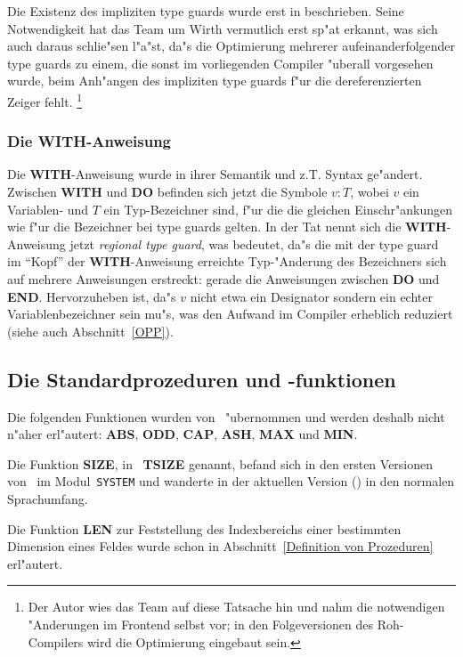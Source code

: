 Die Existenz des impliziten type guards wurde erst in \cite{op2doc} beschrieben.
Seine Notwendigkeit hat das Team um Wirth vermutlich erst sp"at erkannt, was
sich auch daraus schlie"sen l"a"st, da"s die Optimierung mehrerer aufeinanderfolgender
type guards zu einem, die sonst im vorliegenden Compiler "uberall vorgesehen
wurde, beim Anh"angen des impliziten type guards f"ur die dereferenzierten Zeiger
fehlt.%
\footnote{Der Autor wies das Team auf diese Tatsache hin und nahm die notwendigen
  "Anderungen im Frontend selbst vor; in den Folgeversionen des Roh-Compilers
  wird die Optimierung eingebaut sein.}

\subsubsection{Die {\bf WITH}-Anweisung}
\label{WITH-Anweisung}

Die {\bf WITH}-Anweisung wurde in ihrer Semantik und z.T. Syntax ge"andert.
Zwischen {\bf WITH} und {\bf DO} befinden sich jetzt die Symbole
$v: T$, wobei $v$ ein Variablen- und $T$ ein Typ-Bezeichner sind, f"ur die die
gleichen  Einschr"ankungen wie f"ur die Bezeichner bei type guards gelten.
In der Tat nennt sich die {\bf WITH}-Anweisung jetzt {\it regional type guard},
was bedeutet, da"s die mit der type guard im "`Kopf"' der {\bf WITH}-Anweisung
erreichte Typ-"Anderung des Bezeichners sich auf mehrere Anweisungen erstreckt:
gerade die Anweisungen zwischen {\bf DO} und {\bf END}.
Hervorzuheben ist, da"s $v$ nicht etwa ein Designator sondern ein echter
Variablenbezeichner sein mu"s, was den Aufwand im Compiler erheblich
reduziert (siehe auch Abschnitt~\ref{OPP}).

\subsection{Die Standardprozeduren und -funktionen}

Die folgenden Funktionen wurden von \modula\ "ubernommen und werden deshalb nicht
n"aher erl"autert:
{\bf ABS}, {\bf ODD}, {\bf CAP}, {\bf ASH}, {\bf MAX} und {\bf MIN}.

Die Funktion {\bf SIZE}, in \modula\ {\bf TSIZE} genannt, befand sich in den ersten
Versionen von \oberon\ im Modul~{\tt SYSTEM} und wanderte in der aktuellen
Version (\cite{oberon2}) in den normalen Sprachumfang.

Die Funktion {\bf LEN} zur Feststellung des Indexbereichs einer bestimmten
Dimension eines Feldes wurde schon in Abschnitt~\ref{Definition von Prozeduren}
erl"autert.

